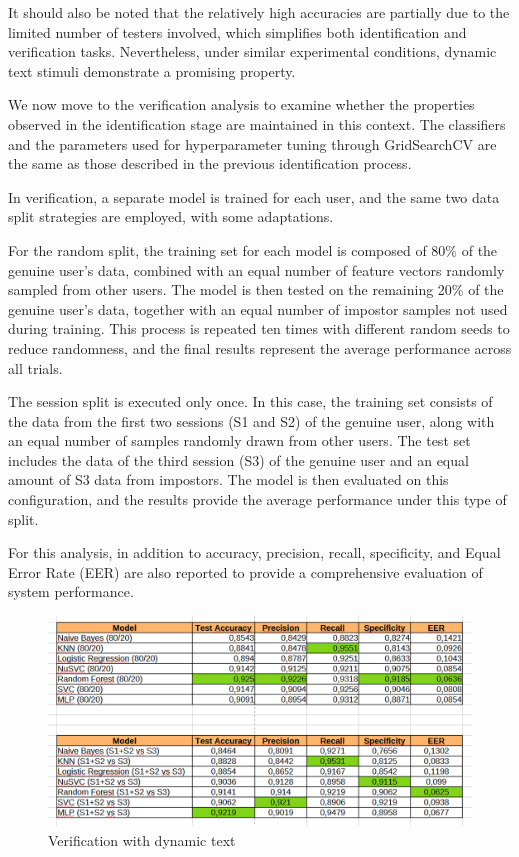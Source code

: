 \documentclass{article}
\begin{document}
It should also be noted that the relatively high accuracies are partially due to the limited number of testers involved, which simplifies both identification and verification tasks. 
Nevertheless, under similar experimental conditions, dynamic text stimuli demonstrate a promising property.

We now move to the verification analysis to examine whether the properties observed in the identification stage are maintained in this context.
The classifiers and the parameters used for hyperparameter tuning through GridSearchCV are the same as those described in the previous identification process.

In verification, a separate model is trained for each user, and the same two data split strategies are employed, with some adaptations.

For the random split, the training set for each model is composed of 80\% of the genuine user’s data, combined with an equal number of feature vectors randomly sampled from other users. 
The model is then tested on the remaining 20\% of the genuine user’s data, together with an equal number of impostor samples not used during training.
This process is repeated ten times with different random seeds to reduce randomness, and the final results represent the average performance across all trials.

The session split is executed only once. 
In this case, the training set consists of the data from the first two sessions (S1 and S2) of the genuine user, along with an equal number of samples randomly drawn from other users. 
The test set includes the data of the third session (S3) of the genuine user and an equal amount of S3 data from impostors.
The model is then evaluated on this configuration, and the results provide the average performance under this type of split.

For this analysis, in addition to accuracy, precision, recall, specificity, and Equal Error Rate (EER) are also reported to provide a comprehensive evaluation of system performance.

\begin{figure}[ht]
    \centering
    \includegraphics[width = 0.6
    \textwidth]{Images/Results/Static_Dynamic/Ver_mov.png}
    \caption{Verification with dynamic text}
    \label{fig:ver_dyn}
\end{figure}
\end{document}
